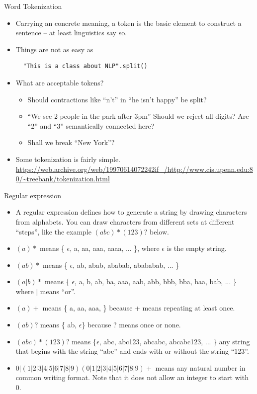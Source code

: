 \documentclass[11pt, handout]{beamer}
\begin{document}
\begin{frame}[fragile]{Word Tokenization}
\begin{itemize}[<+->]
 \item Carrying an concrete meaning, a token is the basic element to construct a sentence -- at least linguistics say so. 
 \item Things are not as easy as 
 \begin{lstlisting}
  "This is a class about NLP".split()
 \end{lstlisting}
 \item What are acceptable tokens?
 \begin{itemize}
  \item Should contractions like ``n't'' in ``he isn't happy'' be split? 
  \item  ``We see 2 people in the park after 3pm'' Should we reject all digits? Are ``2'' and ``3'' semantically connected here? 
  \item Shall we break ``New York''? 
 \end{itemize}
 \item Some tokenization is fairly simple. \url{https://web.archive.org/web/19970614072242if_/http://www.cis.upenn.edu:80/~treebank/tokenization.html}
\end{itemize}
\end{frame}


\begin{frame}{Regular expression}
\begin{itemize}[<+->]
 \item A regular expression defines how to generate a string by drawing characters from alphabets. You can draw characters from different sets at different ``steps'', like the example $(abc)*(123)?$ below. 
 \item $(a)*$ means \{ $\epsilon$, a, aa, aaa, aaaa, ... \}, where $\epsilon$ is the empty string. 
 \item $(ab)*$ means \{ $\epsilon$, ab, abab, ababab, abababab, ... \}
 \item $(a|b)*$ means \{ $\epsilon$, a, b, ab, ba, aaa, aab, abb, bbb, bba, baa,  bab, ... \} where $|$ means ``or''. 
 \item $(a)+$ means \{ a, aa, aaa, \} because + means repeating at least once. 
 \item $(ab)?$ means \{ ab, $\epsilon$\} because ? means once or none. 
 \item $(abc)*(123)?$ means \{$\epsilon$, abc, abc123, abcabc, abcabc123, ... \} any string that begins with the string ``abc'' and ends with or without the string ``123''. 
 \item $0|(1|2|3|4|5|6|7|8|9)(0|1|2|3|4|5|6|7|8|9)+$ means any natural number in common writing format. Note that it does not allow an integer to start with 0. 
\end{itemize} 
\end{frame}
\end{document}
